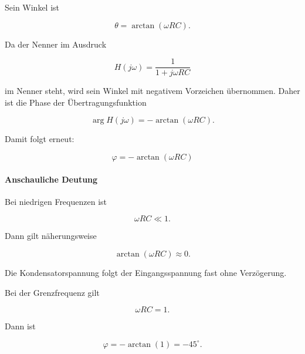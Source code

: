 Sein Winkel ist

\begin{equation}
	\theta
	=
	\arctan(\omega RC).
	\label{eq:rc-winkel-nenner}
\end{equation}

Da der Nenner im Ausdruck

\[
H(j\omega)=\frac{1}{1+j\omega RC}
\]

im Nenner steht, wird sein Winkel mit negativem Vorzeichen übernommen. Daher
ist die Phase der Übertragungsfunktion

\begin{equation}
	\arg H(j\omega)
	=
	-\arctan(\omega RC).
	\label{eq:rc-phase-uebertragungsfunktion}
\end{equation}

Damit folgt erneut:

\begin{equation}
	\boxed{
		\varphi
		=
		-\arctan(\omega RC)
	}
	\label{eq:rc-phasenverschiebung-endformel-komplex}
\end{equation}

\paragraph{Anschauliche Deutung}

Bei niedrigen Frequenzen ist

\begin{equation}
	\omega RC \ll 1.
	\label{eq:rc-phase-niedrige-frequenz}
\end{equation}

Dann gilt näherungsweise

\begin{equation}
	\arctan(\omega RC) \approx 0.
	\label{eq:rc-phase-niedrige-frequenz-naeherung}
\end{equation}

Die Kondensatorspannung folgt der Eingangsspannung fast ohne Verzögerung.

Bei der Grenzfrequenz gilt

\begin{equation}
	\omega RC = 1.
	\label{eq:rc-phase-grenzfrequenz-bedingung}
\end{equation}

Dann ist

\begin{equation}
	\varphi
	=
	-\arctan(1)
	=
	-45^\circ.
	\label{eq:rc-phase-grenzfrequenz}
\end{equation}

